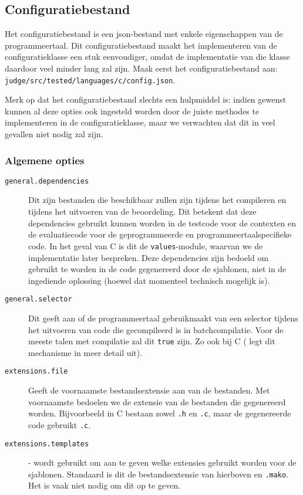 \inputminted{text}{code/dirs-c-code-location.txt}

\subsection{Configuratiebestand}\label{subsec:configuratiebestand}

Het configuratiebestand is een json-bestand met enkele eigenschappen van de programmeertaal.
Dit configuratiebestand maakt het implementeren van de configuratieklasse een stuk eenvoudiger, omdat de implementatie van die klasse daardoor veel minder lang zal zijn.
Maak eerst het configuratiebestand aan: \texttt{judge/src/tested/languages/c/config.json}.

Merk op dat het configuratiebestand slechts een hulpmiddel is: indien gewenst kunnen al deze opties ook ingesteld worden door de juiste methodes te implementeren in de configuratieklasse, maar we verwachten dat dit in veel gevallen niet nodig zal zijn.

\subsubsection{Algemene opties}

\begin{description}
    \item[\texttt{general.dependencies}] Dit zijn bestanden die beschikbaar zullen zijn tijdens het compileren en tijdens het uitvoeren van de beoordeling.
    Dit betekent dat deze dependencies gebruikt kunnen worden in de testcode voor de contexten en de evaluatiecode voor de geprogrammeerde en programmeertaalspecifieke code.
    In het geval van C is dit de \texttt{values}-module, waarvan we de implementatie later bespreken.
    Deze dependencies zijn bedoeld om gebruikt te worden in de code gegenereerd door de sjablonen, niet in de ingediende oplossing (hoewel dat momenteel technisch mogelijk is).
    \item[\texttt{general.selector}] Dit geeft aan of de programmeertaal gebruikmaakt van een selector tijdens het uitvoeren van code die gecompileerd is in batchcompilatie.
    Voor de meeste talen met compilatie zal dit \texttt{true} zijn.
    Zo ook bij C ( legt dit mechanisme in meer detail uit).
    \item[\texttt{extensions.file}] Geeft de voornaamste bestandsextensie aan van de bestanden.
    Met voornaamste bedoelen we de extensie van de bestanden die gegenereerd worden.
    Bijvoorbeeld in C bestaan zowel \texttt{.h} en \texttt{.c}, maar de gegenereerde code gebruikt \texttt{.c}.
    \item[\texttt{extensions.templates}] - wordt gebruikt om aan te geven welke extensies gebruikt worden voor de sjablonen.
    Standaard is dit de bestandsextensie van hierboven en \texttt{.mako}.
    Het is vaak niet nodig om dit op te geven.
\end{description}

